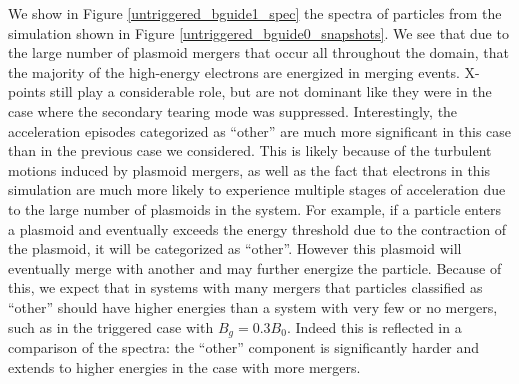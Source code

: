 \documentclass[iop,twocolappendix]{emulateapj}
\begin{document}
We show in Figure \ref{untriggered_bguide1_spec} the spectra of particles from the simulation shown in Figure \ref{untriggered_bguide0_snapshots}.  We see that due to the large number of plasmoid mergers that occur all throughout the domain, that the majority of the high-energy electrons are energized in merging events.  X-points still play a considerable role, but are not dominant like they were in the case where the secondary tearing mode was suppressed.  Interestingly, the acceleration episodes categorized as ``other'' are much more significant in this case than in the previous case we considered.  This is likely because of the turbulent motions induced by plasmoid mergers, as well as the fact that electrons in this simulation are much more likely to experience multiple stages of acceleration due to the large number of plasmoids in the system.  For example, if a particle enters a plasmoid and eventually exceeds the energy threshold due to the contraction of the plasmoid, it will be categorized as ``other''.  However this plasmoid will eventually merge with another and may further energize the particle.  Because of this, we expect that in systems with many mergers that particles classified as ``other'' should have higher energies than a system with very few or no mergers, such as in the triggered case with $B_{g}=0.3B_{0}$.  Indeed this is reflected in a comparison of the spectra: the ``other'' component is significantly harder and extends to higher energies in the case with more mergers.
\end{document}
